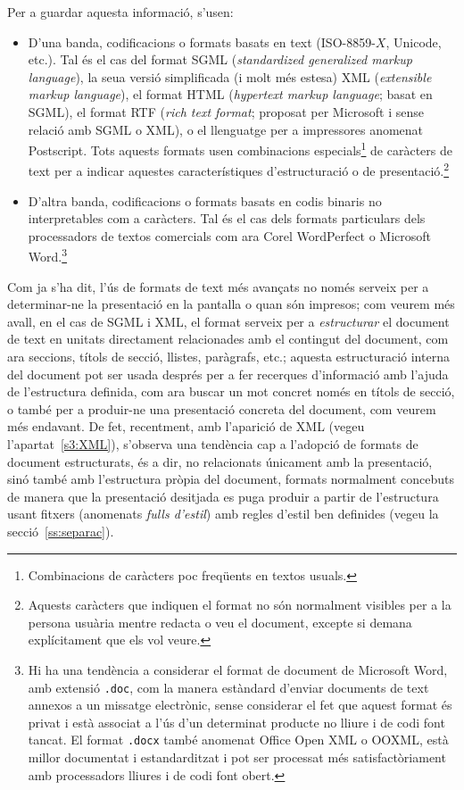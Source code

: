 Per a guardar aquesta informació, s'usen:
\begin{itemize}
\item D'una banda, codificacions o formats basats en text
  (ISO-8859-$X$, Unicode, etc.). Tal és el cas del format SGML
  (\emph{standardized generalized markup language}), la seua versió
  simplificada (i molt més estesa) XML (\emph{extensible markup
    language}), el format HTML (\emph{hypertext markup language};
  basat en SGML), el format RTF (\emph{rich text format}; proposat per
  Microsoft i sense relació amb SGML o XML), o el llenguatge per a
  impressores anomenat Postscript. Tots aquests formats usen
  combinacions especials\footnote{Combinacions de caràcters poc
    freqüents en textos usuals.} de caràcters de text per a indicar
  aquestes característiques d'estructuració o de
  presentació.\footnote{Aquests caràcters que indiquen el format no
    són normalment visibles per a la persona usuària mentre redacta o
    veu el document, excepte si demana explícitament que els vol
    veure.}
\item D'altra banda, codificacions o formats basats en codis binaris
  no interpretables com a caràcters. Tal és el cas dels formats
  particulars dels processadors de textos comercials com ara Corel
  WordPerfect o Microsoft Word.\footnote{Hi ha una tendència a
    considerar el format de document de Microsoft Word, amb extensió
    \texttt{.doc}, com la manera estàndard d'enviar documents de text
    annexos a un missatge electrònic, sense considerar el fet que
    aquest format és privat i està associat a l'ús d'un determinat
    producte no lliure i de codi font tancat. El format \texttt{.docx}
    també anomenat Office Open XML o OOXML, està millor documentat i
    estandarditzat i pot ser processat més satisfactòriament amb
    processadors lliures i de codi font obert.}
\end{itemize}
Com ja s'ha dit, l'ús de formats de text més avançats no només serveix
per a determinar-ne la presentació en la pantalla o quan són impresos;
com veurem més avall, en el cas de SGML i XML, el format serveix per a
\emph{estructurar} el document de text en unitats directament
relacionades amb el contingut del document, com ara seccions, títols
de secció, llistes, paràgrafs, etc.; aquesta estructuració interna del
document pot ser usada després per a fer recerques d'informació amb
l'ajuda de l'estructura definida, com ara buscar un mot concret només
en títols de secció, o també per a produir-ne una presentació concreta
del document, com veurem més endavant. De fet, recentment, amb
l'aparició de XML (vegeu l'apartat~\ref{s3:XML}), s'observa una
tendència cap a l'adopció de formats de document estructurats, és a
dir, no relacionats únicament amb la presentació, sinó també amb
l'estructura pròpia del document, formats normalment concebuts de
manera que la presentació desitjada es puga produir a partir de
l'estructura usant fitxers (anomenats \emph{fulls d'estil}) amb regles
d'estil ben definides (vegeu la secció~\ref{ss:separac}).

